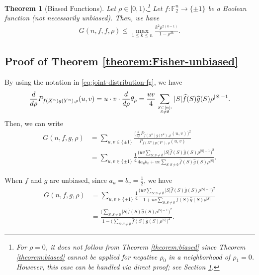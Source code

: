 \documentclass[journal,draftcls, onecolumn]{IEEEtran}
\newtheorem{theorem}{Theorem}
\begin{document}
\begin{theorem}[Biased Functions] \label{theorem:Fisher-biased}
Let $\rho \in [0,1)$.\footnote{For $\rho=0$, it does not follow from Theorem \ref{theorem:biased} since 
Theorem \ref{theorem:biased} cannot be applied for negative $\rho_0$ in a neighborhood of $\rho_1=0$. 
However, this case can be handled via direct proof; see Section \ref{theorem:Fisher-biased}.} 
Let $f:\mathbb{F}_2^n \to \{\pm 1\}$ be a Boolean function (not necessarily unbiased). Then, we have
\begin{align*}
G(n,f,f,\rho) \le \max_{1\le k \le n} \frac{k^2 \rho^{2(k-1)}}{1-\rho^{2k}}.
\end{align*}
\end{theorem}


\subsection{Proof of Theorem \ref{theorem:Fisher-unbiased}} \label{subsec:proof-Fisher-unbiased}

By using the notation in \eqref{eq:joint-distribution-fg}, we have
\begin{align*}
\frac{d}{d\rho} P_{f(X^n)g(Y^n),\rho}(u,v) = u\cdot v\cdot \frac{d}{d\rho} \theta_\rho 
= \frac{uv}{4} \sum_{S\subset [n]: \atop S\neq \emptyset} |S| \widehat{f}(S) \widehat{g}(S) \rho^{|S|-1}.
\end{align*}
Then, we can write
\begin{align*}
G(n,f,g,\rho) &= \sum_{u,v \in \{\pm 1\}} \frac{\bigg( \frac{d}{d\rho} P_{f(X^n)g(Y^n),\rho}(u,v) \bigg)^2}{P_{f(X^n)g(Y^n),\rho}(u,v)} \\
&= \sum_{u,v \in \{\pm 1\}} \frac{1}{4} \frac{\big( uv \sum_{S: S\neq \emptyset} |S| \widehat{f}(S) \widehat{g}(S) \rho^{|S|-1}\big)^2}{4 a_u b_v + uv \sum_{S: S\neq \emptyset} \widehat{f}(S) \widehat{g}(S) \rho^{|S|}}.
\end{align*}

When $f$ and $g$ are unbiased, since $a_u = b_v = \frac{1}{2}$, we have
\begin{align*}
G(n,f,g,\rho) &= \sum_{u,v \in \{\pm 1\}} \frac{1}{4} \frac{\big( uv \sum_{S: S\neq \emptyset} |S| \widehat{f}(S) \widehat{g}(S) \rho^{|S|-1}\big)^2}{1 + uv \sum_{S: S\neq \emptyset} \widehat{f}(S) \widehat{g}(S) \rho^{|S|}}  \\
&= \frac{\big( \sum_{S: S\neq \emptyset} |S| \widehat{f}(S) \widehat{g}(S) \rho^{|S|-1}\big)^2}{1 - \big(\sum_{S: S\neq \emptyset} \widehat{f}(S) \widehat{g}(S) \rho^{|S|}\big)^2}.
\end{align*}
\end{document}
